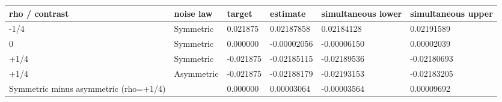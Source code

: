 \begin{tabular}{llllll}
rho / contrast & noise law & target & estimate & simultaneous lower & simultaneous upper \\
\hline
-1/4 & Symmetric & 0.021875 & 0.02187858 & 0.02184128 & 0.02191589 \\
0 & Symmetric & 0.000000 & -0.00002056 & -0.00006150 & 0.00002039 \\
+1/4 & Symmetric & -0.021875 & -0.02185115 & -0.02189536 & -0.02180693 \\
+1/4 & Asymmetric & -0.021875 & -0.02188179 & -0.02193153 & -0.02183205 \\
Symmetric minus asymmetric (rho=+1/4) &  & 0.000000 & 0.00003064 & -0.00003564 & 0.00009692 \\
\end{tabular}

